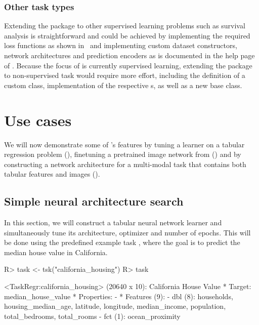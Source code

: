 \documentclass[article]{jss}
\theoremstyle{definition}
\begin{document}
\subsubsection{Other task types}

Extending the package to other supervised learning problems such as survival analysis is straightforward and could be achieved by implementing the required loss functions as shown in~ and implementing custom dataset constructors, network architectures and prediction encoders as is documented in the help page of .
Because the focus of  is currently  supervised learning, extending the package to non-supervised task would require more effort, including the definition of a custom  class, implementation of the respective s, as well as a new  base class.

\section{Use cases}\label{sec:use-cases}

We will now demonstrate some of 's features by tuning a \torch{} learner on a tabular regression problem (), finetuning a pretrained image network from  () and by constructing a network architecture for a multi-modal task that contains both tabular features and images ().

\subsection{Simple neural architecture search}\label{sec:tuning}

In this section, we will construct a tabular neural network learner and simultaneously tune its architecture, optimizer and number of epochs.
This will be done using the predefined  example task \citep{ref-pace1997sparse}, where the goal is to predict the median house value in California.

\begin{CodeInput}
R> task <- tsk("california_housing")
R> task
\end{CodeInput}
\begin{CodeOutput}
<TaskRegr:california_housing> (20640 x 10): California House Value
* Target: median_house_value
* Properties: -
* Features (9):
  - dbl (8): households, housing_median_age, latitude, longitude,
    median_income, population, total_bedrooms, total_rooms
  - fct (1): ocean_proximity
\end{CodeOutput}
\end{document}
